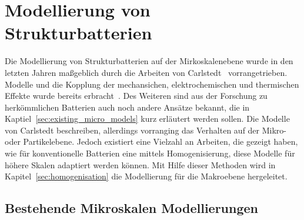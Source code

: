 \chapter{\label{sec:modelling_SB}Modellierung von Strukturbatterien}
Die Modellierung von Strukturbatterien auf der Mirkoskalenebene wurde in den letzten Jahren maßgeblich durch die Arbeiten von Carlstedt~\cite{Carlstedt2018,Carlstedt2019,Carlstedt2022a,Carlstedt2023} vorrangetrieben. Modelle und die Kopplung der mechansichen, elektrochemischen und thermischen Effekte wurde bereits erbracht~\cite{Carlstedt2022,Carlstedt2022b}. Des Weiteren sind aus der Forschung zu herkömmlichen Batterien auch noch andere Ansätze bekannt, die in Kaptiel~\ref{sec:existing_micro_models} kurz erläutert werden sollen. Die Modelle von Carlstedt beschreiben, allerdings vorranging das Verhalten auf der Mikro- oder Partikelebene. Jedoch existiert eine Vielzahl an Arbeiten, die gezeigt haben, wie für konventionelle Batterien eine mittels Homogenisierung, diese Modelle für höhere Skalen adaptiert werden können. Mit Hilfe dieser Methoden wird in Kapitel~\ref{sec:homogenisation} die Modellierung für die Makroebene hergeleitet.

\section{\label{sec:existing_micro_models}Bestehende Mikroskalen Modellierungen}

